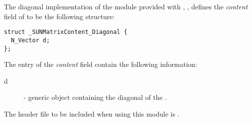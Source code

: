 
The diagonal implementation of the {\sunmatrix} module provided with
{\sundials}, {\sunmatdiag}, defines the {\em content} field
of  to be the following structure:
\begin{verbatim} 
struct _SUNMatrixContent_Diagonal {
  N_Vector d;
};
\end{verbatim}
The entry of the \emph{content} field contain the following
information:
\begin{description}
  \item[d] - generic {\nvector} object containing the diagonal of the
  {\sunmatrix}.
\end{description}

\noindent The header file to be included when using this module 
is . \\

